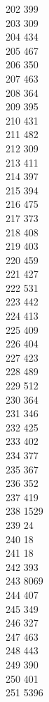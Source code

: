 { 202	399 \\
 203	309 \\
 204	434 \\
 205	467 \\
 206	350 \\
 207	463 \\
 208	364 \\
 209	395 \\
 210	431 \\
 211	482 \\
 212	309 \\
 213	411 \\
 214	397 \\
 215	394 \\
 216	475 \\
 217	373 \\
 218	408 \\
 219	403 \\
 220	459 \\
 221	427 \\
 222	531 \\
 223	442 \\
 224	413 \\
 225	409 \\
 226	404 \\
 227	423 \\
 228	489 \\
 229	512 \\
 230	364 \\
 231	346 \\
 232	425 \\
 233	402 \\
 234	377 \\
 235	367 \\
 236	352 \\
 237	419 \\
 238	1529 \\
 239	24 \\
 240	18 \\
 241	18 \\
 242	393 \\
 243	8069 \\
 244	407 \\
 245	349 \\
 246	327 \\
 247	463 \\
 248	443 \\
 249	390 \\
 250	401 \\
 251	5396 \\
}
